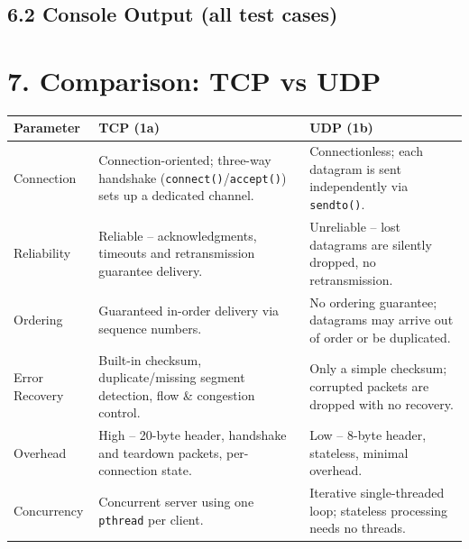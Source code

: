 \documentclass[11pt]{article}
\begin{document}
\subsection*{6.2 Console Output (all test cases)}


\section*{7. Comparison: TCP vs UDP}
\begin{center}
\renewcommand{\arraystretch}{1.3}
\begin{tabular}{p{2.6cm}p{5.6cm}p{5.6cm}}
\toprule
\textbf{Parameter} & \textbf{TCP (1a)} & \textbf{UDP (1b)} \\
\midrule
Connection & Connection-oriented; three-way handshake (\texttt{connect()}/\texttt{accept()}) sets up a dedicated channel. & Connectionless; each datagram is sent independently via \texttt{sendto()}. \\
Reliability & Reliable -- acknowledgments, timeouts and retransmission guarantee delivery. & Unreliable -- lost datagrams are silently dropped, no retransmission. \\
Ordering & Guaranteed in-order delivery via sequence numbers. & No ordering guarantee; datagrams may arrive out of order or be duplicated. \\
Error Recovery & Built-in checksum, duplicate/missing segment detection, flow \& congestion control. & Only a simple checksum; corrupted packets are dropped with no recovery. \\
Overhead & High -- 20-byte header, handshake and teardown packets, per-connection state. & Low -- 8-byte header, stateless, minimal overhead. \\
Concurrency & Concurrent server using one \texttt{pthread} per client. & Iterative single-threaded loop; stateless processing needs no threads. \\
\bottomrule
\end{tabular}
\end{center}
\end{document}
